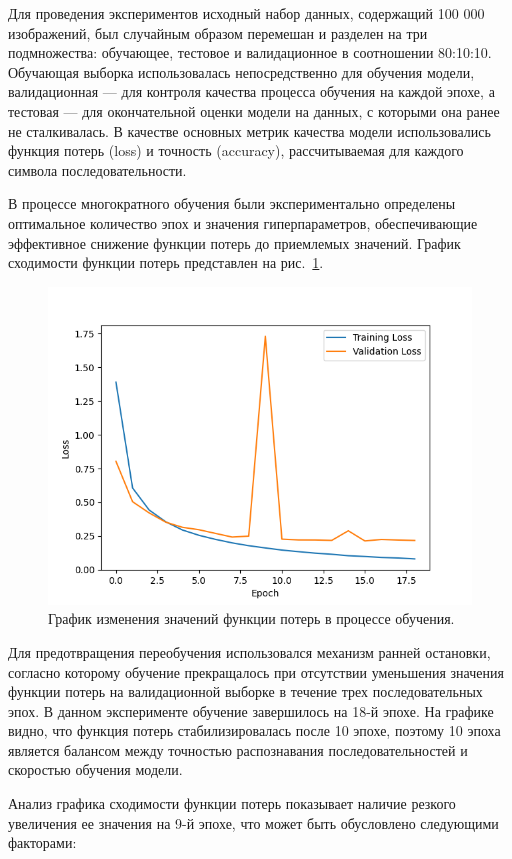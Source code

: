 Для проведения экспериментов исходный набор данных, содержащий 100 000 
изображений, был случайным образом перемешан и разделен на три подмножества: 
обучающее, тестовое и валидационное в соотношении 80:10:10. Обучающая выборка 
использовалась непосредственно для обучения модели, валидационная — для контроля 
качества процесса обучения на каждой эпохе, а тестовая — для окончательной 
оценки модели на данных, с которыми она ранее не сталкивалась. В качестве 
основных метрик качества модели использовались функция потерь (loss) и точность 
(accuracy), рассчитываемая для каждого символа последовательности.

В процессе многократного обучения были экспериментально определены оптимальное 
количество эпох и значения гиперпараметров, обеспечивающие эффективное снижение 
функции потерь до приемлемых значений. График сходимости функции потерь 
представлен на рис.~\ref{fig:loss}.

\begin{figure}[H]
    \centering
    \includegraphics[width=0.8\linewidth]{imgs/textcaptcha/Model_loss.png}
    \caption{График изменения значений функции потерь в процессе обучения.}
    \label{fig:loss}
\end{figure}

Для предотвращения переобучения использовался механизм ранней остановки, согласно 
которому обучение прекращалось при отсутствии уменьшения значения функции потерь 
на валидационной выборке в течение трех последовательных эпох. В данном 
эксперименте обучение завершилось на 18-й эпохе. На графике видно, что функция 
потерь стабилизировалась после 10 эпохе, поэтому 10 эпоха является балансом между 
точностью распознавания последовательностей и скоростью обучения модели.

Анализ графика сходимости функции потерь показывает наличие резкого увеличения ее 
значения на 9-й эпохе, что может быть обусловлено следующими факторами:

